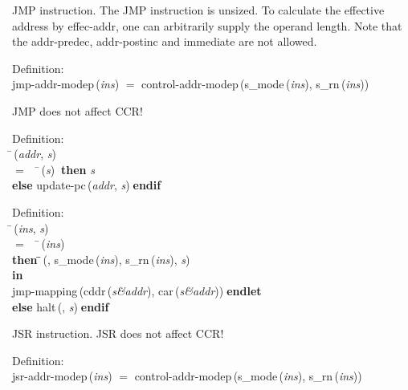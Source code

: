  JMP instruction.
 The JMP instruction is unsized. To calculate the effective address by
 effec-addr,  one can arbitrarily supply the operand length.  Note
 that the addr-predec, addr-postinc and immediate are not allowed.
\begin{tabbing}{\sc Definition}: \\  
{\rm{jmp-addr-modep}}\,({\it{ins\/}}) $=$ {\rm{control-addr-modep}}\,({\rm{s\_mode}}\,({\it{ins\/}}), {\rm{s\_rn}}\,({\it{ins\/}}))
\end{tabbing}

 JMP does not affect CCR!
\begin{tabbing}{\sc Definition}: \\  
\=\,({\it{addr\/}}, {\it{s\/}}) \\ 
$=$$\;\;\;\;$\=\,({\it{s\/}})$\;\;${\bf then }{\it{s\/}} \\ 
{\bf else }{\rm{update-pc}}\,({\it{addr\/}}, {\it{s\/}})$\;${\bf  endif}\-\-
\end{tabbing}

\begin{tabbing}{\sc Definition}: \\  
\=\,({\it{ins\/}}, {\it{s\/}}) \\ 
$=$$\;\;\;\;$\=\,({\it{ins\/}}) \\ 
{\bf then }\=\=\,({}, {\rm{s\_mode}}\,({\it{ins\/}}), {\rm{s\_rn}}\,({\it{ins\/}}), {\it{s\/}})\- \\ 
{\bf in} \\ 
{\rm{jmp-mapping}}\,({\rm{cddr}}\,({\it{s\&addr\/}}), {\rm{car}}\,({\it{s\&addr\/}}))$\;${\bf  endlet}\- \\ 
{\bf else }{\rm{halt}}\,({}, {\it{s\/}})$\;${\bf  endif}\-\-
\end{tabbing}

 JSR instruction.
 JSR does not affect CCR!
\begin{tabbing}{\sc Definition}: \\  
{\rm{jsr-addr-modep}}\,({\it{ins\/}}) $=$ {\rm{control-addr-modep}}\,({\rm{s\_mode}}\,({\it{ins\/}}), {\rm{s\_rn}}\,({\it{ins\/}}))
\end{tabbing}

